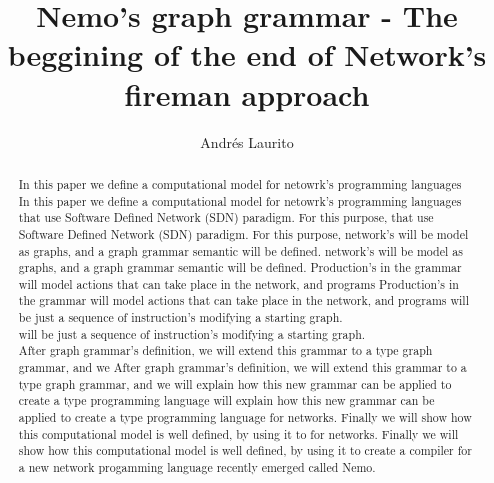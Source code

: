\documentclass[envcountsect,runningheads]{llncs}
\title{Nemo's graph grammar - The beggining of the end of Network's fireman approach}
\author{Andr\'es Laurito}
\institute{
Departamento de Computac\'on - FCEN -UBA\\
 \email{andy.laurito@gmail.com} }
\begin{document}
\maketitle

\begin{abstract}
 In this paper we define a computational model for netowrk's programming languages 
 In this paper we define a computational model for netowrk's programming languages 
 that use Software Defined Network (SDN) paradigm. For this purpose, 
 that use Software Defined Network (SDN) paradigm. For this purpose, 
 network's will be model as graphs, and a graph grammar semantic will be defined. 
 network's will be model as graphs, and a graph grammar semantic will be defined. 
 Production's in the grammar will model actions that can take place in the network, and programs 
 Production's in the grammar will model actions that can take place in the network, and programs 
 will be just a sequence of instruction's modifying a starting graph. \\
 will be just a sequence of instruction's modifying a starting graph. \\
 After graph grammar's definition, we will extend this grammar to a type graph grammar, and we 
 After graph grammar's definition, we will extend this grammar to a type graph grammar, and we 
 will explain how this new grammar can be applied to create a type programming language 
 will explain how this new grammar can be applied to create a type programming language 
 for networks. Finally we will show how this computational model is well defined, by using it to 
 for networks. Finally we will show how this computational model is well defined, by using it to 
 create a compiler for a new network progamming language recently emerged called Nemo.
 \end{abstract}
\end{document}
